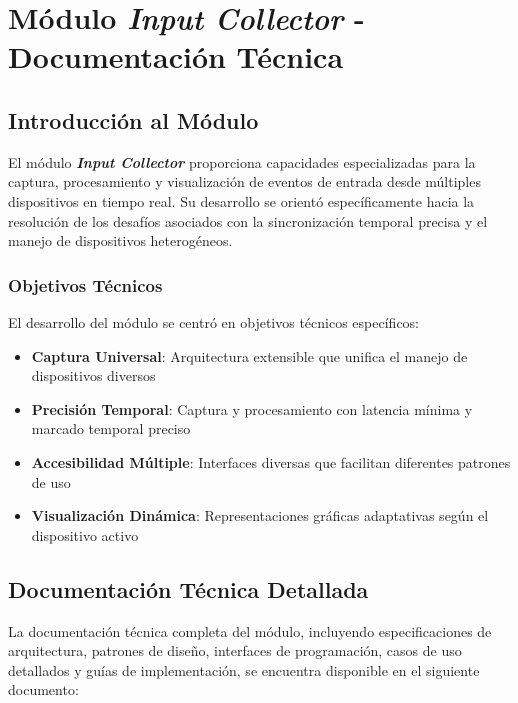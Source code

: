 \chapter[Documentación Técnica \textit{\textbf{Input Collector}}]{Módulo \textit{\textbf{Input Collector}} - Documentación Técnica}
\label{chap:anexo_input_collector}

\section{Introducción al Módulo}
\label{sec:intro_input_collector}

El módulo \textit{\textbf{Input Collector}} proporciona capacidades especializadas para la captura, procesamiento y visualización de eventos de entrada desde múltiples dispositivos en tiempo real. Su desarrollo se orientó específicamente hacia la resolución de los desafíos asociados con la sincronización temporal precisa y el manejo de dispositivos heterogéneos.

\subsection{Objetivos Técnicos}
\label{subsec:objetivos_input_collector}

El desarrollo del módulo se centró en objetivos técnicos específicos:

\begin{itemize}
    \item \textbf{Captura Universal}: Arquitectura extensible que unifica el manejo de dispositivos diversos
    \item \textbf{Precisión Temporal}: Captura y procesamiento con latencia mínima y marcado temporal preciso
    \item \textbf{Accesibilidad Múltiple}: Interfaces diversas que facilitan diferentes patrones de uso
    \item \textbf{Visualización Dinámica}: Representaciones gráficas adaptativas según el dispositivo activo
\end{itemize}

\section{Documentación Técnica Detallada}
\label{sec:doc_tecnica_input_collector}

La documentación técnica completa del módulo, incluyendo especificaciones de arquitectura, patrones de diseño, interfaces de programación, casos de uso detallados y guías de implementación, se encuentra disponible en el siguiente documento:

